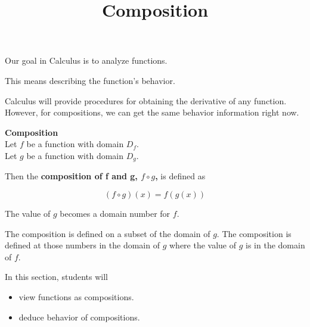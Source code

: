 \documentclass{ximera}
\title{Composition}
\begin{document}
\begin{abstract}
%
\end{abstract}
\maketitle








Our goal in Calculus is to analyze functions.


This means describing the function's behavior.

Calculus will provide procedures for obtaining the derivative of any function.  However, for compositions, we can get the same behavior information right now.






\begin{template} \textbf{\textcolor{blue!55!black}{Composition}}  \\


Let $f$ be a function with domain $D_f$. \\


Let $g$ be a function with domain $D_g$.




Then the \textbf{\textcolor{green!50!black}{composition of f and g, $f \circ g$,}} is defined as

\[
(f \circ g)(x) = f(g(x))
\] 


The value of $g$ becomes a domain number for $f$.


The composition is defined on a subset of the domain of $g$.  The composition is defined at those numbers in the domain of $g$ where the value of $g$ is in the domain of $f$.




\end{template}





\begin{sectionOutcomes}
In this section, students will 

\begin{itemize}
\item view functions as compositions.
\item deduce behavior of compositions.
\end{itemize}
\end{sectionOutcomes}
\end{document}
